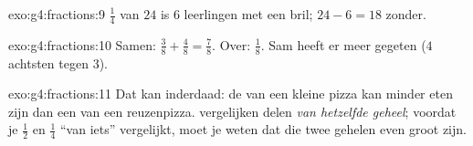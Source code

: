 \begin{solution}{exo:g4:fractions:9}
$\frac14$ van $24$ is $6$ leerlingen met een bril; $24 - 6 = 18$ zonder.
\end{solution}

\begin{solution}{exo:g4:fractions:10}
Samen: $\frac38 + \frac48 = \frac78$. Over: $\frac18$. Sam heeft er meer
gegeten ($4$ achtsten tegen $3$).
\end{solution}

\begin{solution}{exo:g4:fractions:11}
Dat kan inderdaad: de  van een kleine pizza kan minder eten zijn dan
een  van een reuzenpizza.  vergelijken delen \emph{van hetzelfde
geheel}; voordat je $\frac12$ en $\frac14$ ``van iets'' vergelijkt, moet je
weten dat die twee gehelen even groot zijn.
\end{solution}
